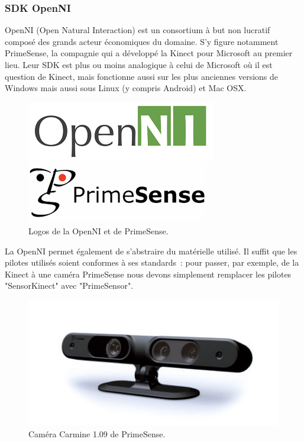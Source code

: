 \subsubsection{SDK OpenNI}
OpenNI (Open Natural Interaction) est un consortium à but non lucratif composé
des grands acteur économiques du domaine. S'y figure notamment PrimeSense, la 
compagnie qui a développé la Kinect pour Microsoft au premier lieu. Leur SDK
est plus ou moins analogique à celui de Microsoft où il est question de
Kinect, mais fonctionne aussi sur les plus anciennes 
versions de Windows mais
aussi sous Linux (y compris Android) et Mac OSX.
\begin{figure}[h!]
\begin{minipage}{0.49\linewidth}
  \centering
  \includegraphics[width=0.9\linewidth]{images/openni_logo}
\end{minipage}
\begin{minipage}{0.49\linewidth}
  \centering
  \includegraphics[width=0.9\linewidth]{images/primesense_logo}
\end{minipage}

\caption{Logos de la OpenNI et de PrimeSense.}
\end{figure}
La OpenNI permet également de s'abstraire du matérielle utilisé. Il suffit que
les pilotes utilisés soient conformes à ses standards~: pour passer, par 
exemple, de la Kinect à une caméra PrimeSense nous devons simplement remplacer 
les pilotes "SensorKinect" avec "PrimeSensor".
\begin{figure}[h!]
\centering
\includegraphics[width=0.6\linewidth]{images/primesense_camera}
\caption{Caméra Carmine 1.09 de PrimeSense.}
\end{figure}

